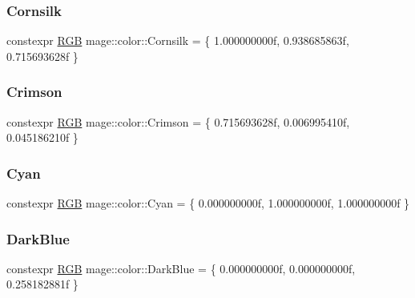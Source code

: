 \subsubsection{\texorpdfstring{Cornsilk}{Cornsilk}}
{\footnotesize\ttfamily constexpr \hyperlink{structmage_1_1_r_g_b}{R\+GB} mage\+::color\+::\+Cornsilk = \{ 1.\+000000000f, 0.\+938685863f, 0.\+715693628f \}}

\hypertarget{namespacemage_1_1color_a3855cb93401fa7336108eac1f9b8c0c7}{}\label{namespacemage_1_1color_a3855cb93401fa7336108eac1f9b8c0c7} 
\subsubsection{\texorpdfstring{Crimson}{Crimson}}
{\footnotesize\ttfamily constexpr \hyperlink{structmage_1_1_r_g_b}{R\+GB} mage\+::color\+::\+Crimson = \{ 0.\+715693628f, 0.\+006995410f, 0.\+045186210f \}}

\hypertarget{namespacemage_1_1color_a2b9093d5d06a4a0421cb602c22deadb5}{}\label{namespacemage_1_1color_a2b9093d5d06a4a0421cb602c22deadb5} 
\subsubsection{\texorpdfstring{Cyan}{Cyan}}
{\footnotesize\ttfamily constexpr \hyperlink{structmage_1_1_r_g_b}{R\+GB} mage\+::color\+::\+Cyan = \{ 0.\+000000000f, 1.\+000000000f, 1.\+000000000f \}}

\hypertarget{namespacemage_1_1color_abdd3f39d1060d9d691eba6726b5455cc}{}\label{namespacemage_1_1color_abdd3f39d1060d9d691eba6726b5455cc} 
\subsubsection{\texorpdfstring{Dark\+Blue}{DarkBlue}}
{\footnotesize\ttfamily constexpr \hyperlink{structmage_1_1_r_g_b}{R\+GB} mage\+::color\+::\+Dark\+Blue = \{ 0.\+000000000f, 0.\+000000000f, 0.\+258182881f \}}

\hypertarget{namespacemage_1_1color_a69f91a91d64036b98384c4d312c848ea}{}\label{namespacemage_1_1color_a69f91a91d64036b98384c4d312c848ea} 
